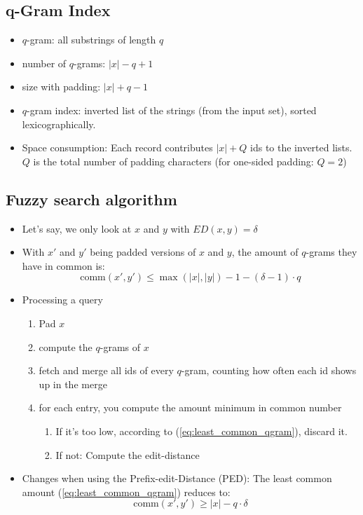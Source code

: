 \documentclass[a4paper]{scrartcl}
\begin{document}
\subsection{q-Gram Index}
\label{sec:q_gram_index}
\begin{itemize}
\item $q$-gram: all substrings of length $q$
\item number of $q$-grams: $|x|-q+1$
\item size with padding: $|x|+q-1$
\item $q$-gram index: inverted list of the strings (from the input set), sorted
  lexicographically.
\item Space consumption: Each record contributes $|x|+Q$ ids to the inverted
  lists. $Q$ is the total number of padding characters (for one-sided padding:
  $Q=2$)
\end{itemize}
\subsection{Fuzzy search algorithm}
\label{sec:fuzzy_search_algorithm}
\begin{itemize}
\item Let's say, we only look at $x$ and $y$ with $ED(x,y)=\delta$
\item With $x'$ and $y'$ being padded versions of $x$ and $y$, the amount of
  $q$-grams they have in common is:
  \begin{equation}
  \mathrm{comm}(x',y')\le \max(|x|,|y|)-1-(\delta - 1)\cdot q\label{eq:least_common_qgram}
\end{equation}

\item Processing a query
  \begin{enumerate}
  \item Pad $x$
  \item compute the $q$-grams of $x$
  \item fetch and merge all ids of every $q$-gram, counting how often each id
    shows up in the merge
  \item for each entry, you compute the amount minimum in common number
    \begin{enumerate}
    \item If it's too low, according to (\ref{eq:least_common_qgram}), discard
      it.
    \item If not: Compute the edit-distance
    \end{enumerate}
    
  \end{enumerate}
\item Changes when using the Prefix-edit-Distance (PED): The least common amount
  (\ref{eq:least_common_qgram}) reduces to:
  \begin{equation}
    \label{eq:least_common_ped}
    \mathrm{comm}(x',y')\ge |x|-q\cdot \delta
  \end{equation}
\end{itemize}
\end{document}
